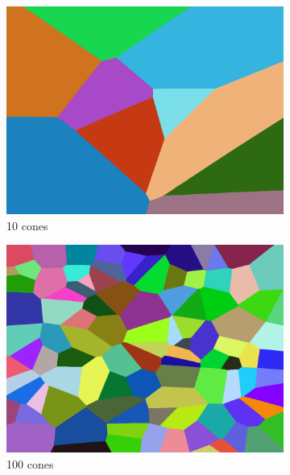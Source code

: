 \documentclass[11pt,a4paper,twoside,openright]{report}
\begin{document}
\begin{figure}[h]
  \centering
  \begin{subfigure}[b]{0.32\textwidth}
    \includegraphics[width=\textwidth]{voronoi10.png}
    \caption{10 cones}
    \label{fig:voronoi1}
  \end{subfigure}
  \begin{subfigure}[b]{0.32\textwidth}
    \includegraphics[width=\textwidth]{voronoi100.png}
    \caption{100 cones}
    \label{fig:voronoi2}
  \end{subfigure}
  \begin{subfigure}[b]{0.32\textwidth}

\end{subfigure}
\end{figure}
\end{document}
